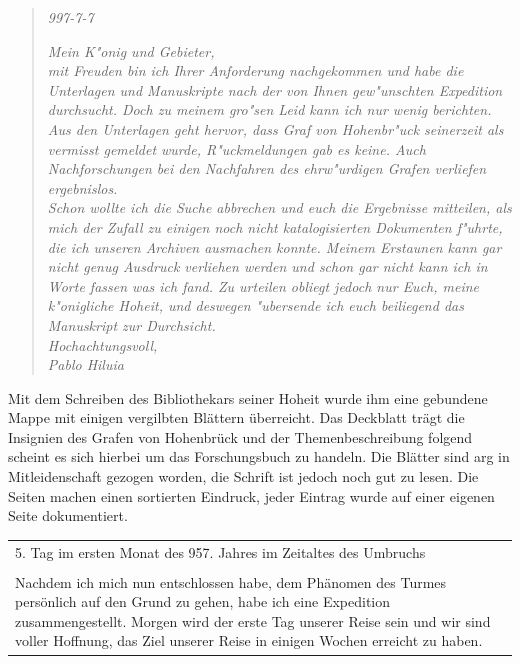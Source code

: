 \begin{quotation}
\begin{flushright}\textit{997-7-7}\end{flushright}
\textit{Mein K"onig und Gebieter,}\\

\textit{mit Freuden bin ich Ihrer Anforderung nachgekommen und habe die Unterlagen und Manuskripte 
nach der von Ihnen gew"unschten Expedition durchsucht. Doch zu meinem gro"sen Leid kann ich nur wenig 
berichten.}\\
\textit{Aus den Unterlagen geht hervor, dass Graf von Hohenbr"uck seinerzeit als vermisst gemeldet 
wurde, R"uckmeldungen gab es keine. Auch Nachforschungen bei den Nachfahren des ehrw"urdigen Grafen 
verliefen ergebnislos.}\\
\textit{Schon wollte ich die Suche abbrechen und euch die Ergebnisse mitteilen, als mich der Zufall 
zu einigen noch nicht katalogisierten Dokumenten f"uhrte, die ich unseren Archiven ausmachen konnte. 
Meinem Erstaunen kann gar nicht genug Ausdruck verliehen werden und schon gar nicht kann ich in Worte 
fassen was ich fand. Zu urteilen obliegt jedoch nur Euch, meine k"onigliche Hoheit, und deswegen "ubersende 
ich euch beiliegend das Manuskript zur Durchsicht.}\\

\textit{Hochachtungsvoll,}\\
\textit{Pablo Hiluia}
\end{quotation}

\par Mit dem Schreiben des Bibliothekars seiner Hoheit wurde ihm eine gebundene Mappe mit einigen 
vergilbten Blättern überreicht. Das Deckblatt trägt die Insignien des Grafen von Hohenbrück und der 
Themenbeschreibung folgend scheint es sich hierbei um das Forschungsbuch zu handeln. Die Blätter sind 
arg in Mitleidenschaft gezogen worden, die Schrift ist jedoch noch gut zu lesen. Die Seiten machen 
einen sortierten Eindruck, jeder Eintrag wurde auf einer eigenen Seite dokumentiert.


\begin{longtable}{|p{15cm}|}
\hline
5. Tag im ersten Monat des 957. Jahres im Zeitaltes des Umbruchs\\
\\
Nachdem ich mich nun entschlossen habe, dem Phänomen des Turmes persönlich auf den Grund zu gehen, 
habe ich eine Expedition zusammengestellt. Morgen wird der erste Tag unserer Reise sein und wir sind 
voller Hoffnung, das Ziel unserer Reise in einigen Wochen erreicht zu haben.\\
\hline
\end{longtable}

